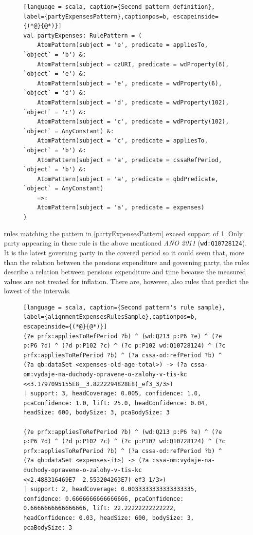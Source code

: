 \begin{figure}[h]
\begin{lstlisting}[language = scala, caption={Second pattern definition}, label={partyExpensesPattern},captionpos=b, escapeinside={(*@}{@*)}]
val partyExpenses: RulePattern = (
    AtomPattern(subject = 'e', predicate = appliesTo, `object` = 'b') &:
    AtomPattern(subject = czURI, predicate = wdProperty(6), `object` = 'e') &:
    AtomPattern(subject = 'e', predicate = wdProperty(6), `object` = 'd') &:
    AtomPattern(subject = 'd', predicate = wdProperty(102), `object` = 'c') &:  
    AtomPattern(subject = 'c', predicate = wdProperty(102), `object` = AnyConstant) &:
    AtomPattern(subject = 'c', predicate = appliesTo, `object` = 'b') &:
    AtomPattern(subject = 'a', predicate = cssaRefPeriod, `object` = 'b') &:
    AtomPattern(subject = 'a', predicate = qbdPredicate, `object` = AnyConstant)
    =>:
    AtomPattern(subject = 'a', predicate = expenses)
)
\end{lstlisting}
\end{figure}

 rules matching the pattern in \ref{partyExpensesPattern} exceed support of 1. Only party appearing in these rule is the above mentioned \textit{ANO 2011} (\verb|wd:Q10728124|). It is the latest governing party in the covered period so it could seem that, more than the relation between the pensions expenditure and governing party, the rules describe a relation between pensions expenditure and time because the measured values are not treated for inflation. There are, however, also rules that predict the lowest of the intervals.

\begin{figure}[h]
\begin{lstlisting}[language = scala, caption={Second pattern's rule sample}, label={alignmentExpensesRulesSample},captionpos=b, escapeinside={(*@}{@*)}]
(?e prfx:appliesToRefPeriod ?b) ^ (wd:Q213 p:P6 ?e) ^ (?e p:P6 ?d) ^ (?d p:P102 ?c) ^ (?c p:P102 wd:Q10728124) ^ (?c prfx:appliesToRefPeriod ?b) ^ (?a cssa-od:refPeriod ?b) ^ (?a qb:dataSet <expenses-old-age-total>) -> (?a cssa-om:vydaje-na-duchody-opravene-o-zalohy-v-tis-kc <<3.1797095155E8__3.8222294828E8)_ef3_3/3>) 
| support: 3, headCoverage: 0.005, confidence: 1.0, pcaConfidence: 1.0, lift: 25.0, headConfidence: 0.04, headSize: 600, bodySize: 3, pcaBodySize: 3

(?e prfx:appliesToRefPeriod ?b) ^ (wd:Q213 p:P6 ?e) ^ (?e p:P6 ?d) ^ (?d p:P102 ?c) ^ (?c p:P102 wd:Q10728124) ^ (?c prfx:appliesToRefPeriod ?b) ^ (?a cssa-od:refPeriod ?b) ^ (?a qb:dataSet <expenses-it>) -> (?a cssa-om:vydaje-na-duchody-opravene-o-zalohy-v-tis-kc <<2.488316469E7__2.553204263E7)_ef3_1/3>) 
| support: 2, headCoverage: 0.0033333333333333335, confidence: 0.6666666666666666, pcaConfidence: 0.6666666666666666, lift: 22.22222222222222, headConfidence: 0.03, headSize: 600, bodySize: 3, pcaBodySize: 3
\end{lstlisting}
\end{figure}

